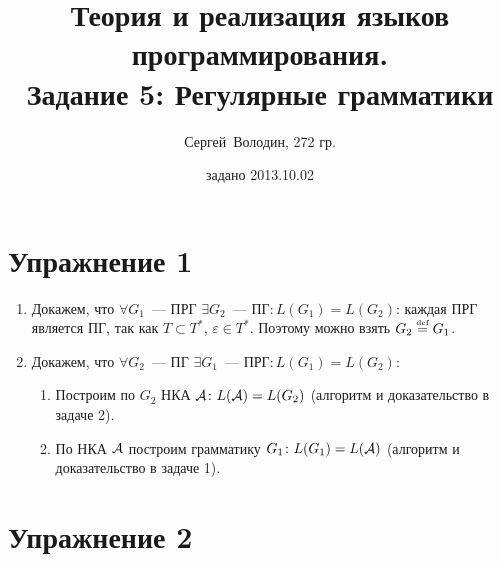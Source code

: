 \documentclass[a4paper]{article}
\title{Теория и реализация языков программирования.\\Задание 5: Регулярные грамматики}
\date{задано 2013.10.02}
\author{Сергей~Володин, 272 гр.}
\def\A{{\cal A}}
\def\eqdef{\overset{\mbox{\tiny def}}{=}}
\begin{document}
\maketitle
\section*{Упражнение 1}
\begin{enumerate}
\item Докажем, что $\forall G_1$~--- ПРГ $\exists G_2$~--- ПГ$\colon L(G_1)=L(G_2)$: каждая ПРГ является ПГ, так как $T\subset T^*$, $\varepsilon\in T^*$. Поэтому можно взять $G_2\eqdef G_1$.
\item Докажем, что $\forall G_2$~--- ПГ $\exists G_1$~--- ПРГ$\colon L(G_1)=L(G_2)$:\begin{enumerate}[1.]
\item Построим по $G_2$ НКА $\A\colon L(\A)=L(G_2)$ (алгоритм и доказательство в задаче 2).
\item По НКА $\A$ построим грамматику $G_1\colon L(G_1)=L(\A)$ (алгоритм и доказательство в задаче 1).
\end{enumerate}
\end{enumerate}
\section*{Упражнение 2}
\end{document}
